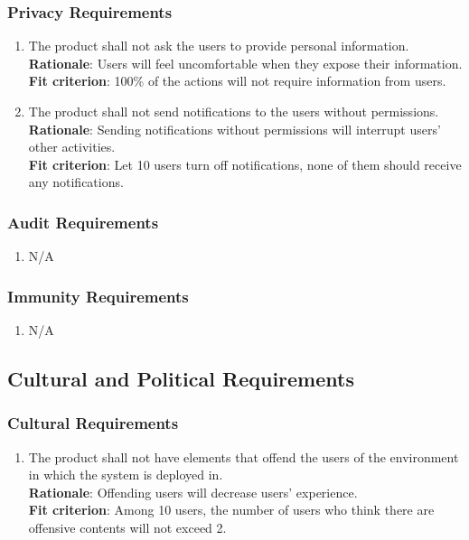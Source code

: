 \documentclass{article}
\begin{document}
\subsubsection{Privacy Requirements}
\begin{enumerate}[SR3.1]
    \item The product shall not ask the users to provide personal information.\\
    \textbf{Rationale}: Users will feel uncomfortable when they expose their information.\\
    \textbf{Fit criterion}: 100\% of the actions will not require information from users.
    \item The product shall not send notifications to the users 
    without permissions.\\
    \textbf{Rationale}: Sending notifications without permissions will
    interrupt users' other activities.\\
    \textbf{Fit criterion}: Let 10 users turn off notifications, none of
    them should receive any notifications.\\
\end{enumerate}
\subsubsection{Audit Requirements}
\begin{enumerate}[SR4.1]
    \item N/A
\end{enumerate}
\subsubsection{Immunity Requirements}
\begin{enumerate}[SR5.1]
    \item N/A
\end{enumerate}
\subsection{Cultural and Political Requirements}
\subsubsection{Cultural Requirements}
\begin{enumerate}[CP1.1]
    \item The product shall not have elements that offend the users of the environment in which the system is deployed in.\\
    \textbf{Rationale}: Offending users will decrease users' experience.\\
    \textbf{Fit criterion}: Among 10 users, the number of users who think there are offensive contents will not exceed 2.\\
\end{enumerate}
\end{document}
